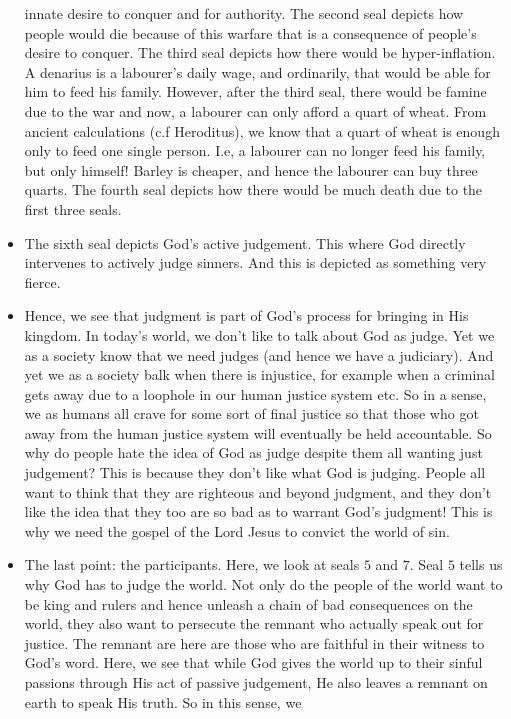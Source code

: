 \begin{itemize}
{  innate desire to conquer and for authority.  The second seal depicts how
  people would die because of this warfare that is a consequence of people's
  desire to conquer.  The third seal depicts how there would be
  hyper-inflation.  A denarius is a labourer's daily wage, and ordinarily,
  that would be able for him to feed his family.  However, after the third
  seal, there would be famine due to the war and now, a labourer can only
  afford a quart of wheat.  From ancient calculations (c.f Heroditus), we
  know that a quart of wheat is enough only to feed one single person.  I.e,
  a labourer can no longer feed his family, but only himself!  Barley is
  cheaper, and hence the labourer can buy three quarts.  The fourth seal
  depicts how there would be much death due to the first three seals.}
  \item{The sixth seal depicts God's active judgement.  This where God
  directly intervenes to actively judge sinners.  And this is depicted as
  something very fierce.}
  \item{Hence, we see that judgment is part of God's process for bringing in
  His kingdom.  In today's world, we don't like to talk about God as judge.
  Yet we as a society know that we need judges (and hence we have a
  judiciary).  And yet we as a society balk when there is injustice, for
  example when a criminal gets away due to a loophole in our human justice
  system etc.  So in a sense, we as humans all crave for some sort of final
  justice so that those who got away from the human justice system will
  eventually be held accountable.  So why do people hate the idea of God as
  judge despite them all wanting just judgement?  This is because they don't
  like what God is judging.  People all want to think that they are righteous
  and beyond judgment, and they don't like the idea that they too are so bad
  as to warrant God's judgment!  This is why we need the gospel of the Lord
  Jesus to convict the world of sin.}
  \item{The last point: the participants.  Here, we look at seals $5$ and
  $7$.  Seal $5$ tells us why God has to judge the world.  Not only do the
  people of the world want to be king and rulers and hence unleash a chain of
  bad consequences on the world, they also want to persecute the remnant who
  actually speak out for justice.  The remnant are here are those who are
  faithful in their witness to God's word.  Here, we see that while God gives
  the world up to their sinful passions through His act of passive judgement,
  He also leaves a remnant on earth to speak His truth.  So in this sense, we
}
\end{itemize}
